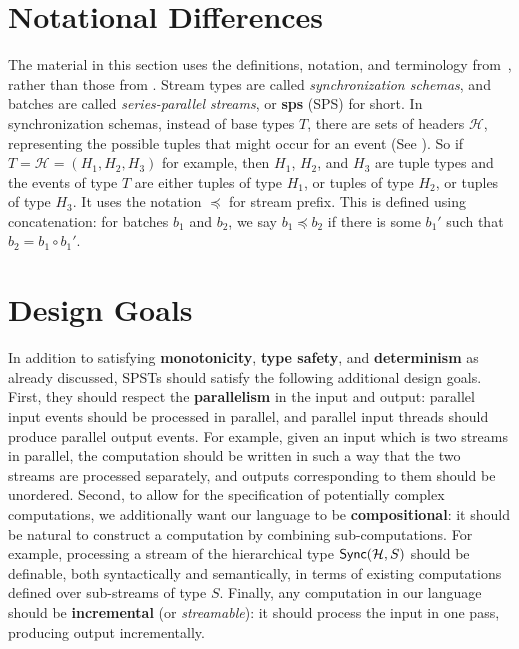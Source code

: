 \section{Notational Differences}

The material in this section uses the definitions, notation, and terminology from~,
rather than those from .
Stream types are called \emph{synchronization schemas},
and batches are called \emph{series-parallel streams}, or \textbf{sps} (SPS)
for short.
In synchronization schemas, instead of base types $T$, there are sets of headers $\mathcal{H}$, representing the possible tuples that might occur for an event
(See ).
So if $T = \mathcal{H} = (H_1, H_2, H_3)$ for example, then $H_1$, $H_2$, and $H_3$ are tuple types and the events of type $T$ are either tuples of type $H_1$, or tuples of type $H_2$, or tuples of type $H_3$.
It uses the notation $\preceq$ for stream prefix.
This is defined using concatenation:
for batches $b_1$ and $b_2$, we say $b_1 \preceq b_2$ if there is some $b_1'$ such that $b_2 = b_1 \circ b_1'$.

\section{Design Goals}
\label{45:sec:design-goals}

In addition to satisfying \textbf{monotonicity}, \textbf{type safety}, and \textbf{determinism} as already discussed,
SPSTs should satisfy the following additional design goals.
First, they should respect the \textbf{parallelism}
in the input and output: parallel input events should be processed in parallel,
and parallel input threads should produce parallel output events.
For example, given an input which is two streams in parallel, the computation should be written in such a way that the two streams are processed separately, and outputs corresponding to them should be unordered.
Second,
to allow for the specification of potentially complex computations, we additionally want our language to be \textbf{compositional}: it should be natural to construct a computation by combining sub-computations.
For example, processing a stream of the hierarchical type $\mathsf{Sync}({\mathcal{H}}, S)$
should be definable, both syntactically and semantically, in terms of
existing computations defined over sub-streams of type $S$.
Finally, any computation in our language should be \textbf{incremental} (or \emph{streamable}): it should process the input in one pass, producing output incrementally.

